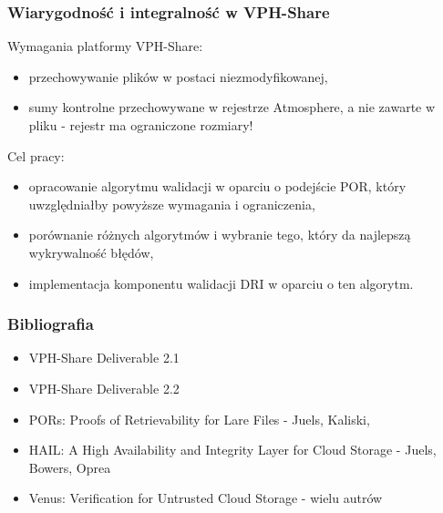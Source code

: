 \documentclass{beamer}
\begin{document}

\begin{frame}
\frametitle{Wiarygodność i integralność w VPH-Share}

\begin{block}{Wymagania platformy VPH-Share:}
\begin{itemize}
	\item przechowywanie plików w postaci niezmodyfikowanej,
	\item sumy kontrolne przechowywane w rejestrze Atmosphere, a nie zawarte w pliku - rejestr ma ograniczone rozmiary!
\end{itemize}
\end{block}

\begin{block}{Cel pracy:}
\begin{itemize}
	\item opracowanie algorytmu walidacji w oparciu o podejście POR, który uwzględniałby powyższe wymagania i ograniczenia,
	\item porównanie różnych algorytmów i wybranie tego, który da najlepszą wykrywalność błędów,
	\item implementacja komponentu walidacji DRI w oparciu o ten algorytm.
\end{itemize}
\end{block}

\end{frame}


\begin{frame}
\frametitle{Bibliografia}

\begin{itemize}
	\item VPH-Share Deliverable 2.1
	\item VPH-Share Deliverable 2.2
	\item PORs: Proofs of Retrievability for Lare Files - Juels, Kaliski,
	\item HAIL: A High Availability and Integrity Layer for Cloud Storage - Juels, Bowers, Oprea
	\item Venus: Verification for Untrusted Cloud Storage - wielu autrów
\end{itemize}

\end{frame}
\end{document}
